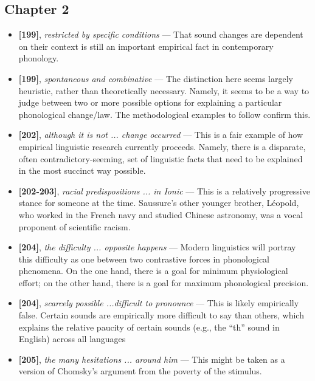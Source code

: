 \documentclass[12pt]{article}
\begin{document}
\subsection{Chapter 2}

\begin{itemize}

\item \textbf{[199]}, \textit{restricted by specific conditions} --- That sound changes are dependent on their context is still an important empirical fact in contemporary phonology.

\item \textbf{[199]}, \textit{spontaneous and combinative} --- The distinction here seems largely heuristic, rather than theoretically necessary. Namely, it seems to be a way to judge between two or more possible options for explaining a particular phonological change/law. The methodological examples to follow confirm this.

\item \textbf{[202]}, \textit{although it is not ... change occurred} --- This is a fair example of how empirical linguistic research currently proceeds. Namely, there is a disparate, often contradictory-seeming, set of linguistic facts that need to be explained in the most succinct way possible.

\item \textbf{[202-203]}, \textit{racial predispositions ... in Ionic} --- This is a relatively progressive stance for someone at the time. Saussure's other younger brother, L\'{e}opold, who worked in the French navy and studied Chinese astronomy, was a vocal proponent of scientific racism.

\item \textbf{[204]}, \textit{the difficulty ... opposite happens} --- Modern linguistics will portray this difficulty as one between two contrastive forces in phonological phenomena. On the one hand, there is a goal for minimum physiological effort; on the other hand, there is a goal for maximum phonological precision.  

\item \textbf{[204]}, \textit{scarcely possible ...difficult to pronounce} --- This is likely empirically false. Certain sounds are empirically more difficult to say than others, which explains the relative paucity of certain sounds (e.g., the ``th'' sound in English) across all languages

\item \textbf{[205]}, \textit{the many hesitations ... around him} --- This might be taken as a version of Chomsky's argument from the poverty of the stimulus.


\end{itemize}
\end{document}
